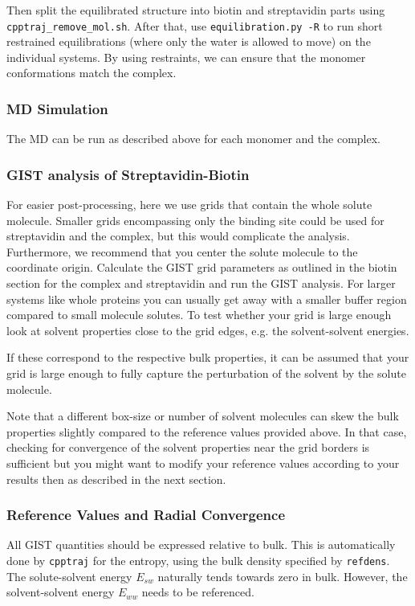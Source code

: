 \documentclass[9pt,tutorial]{livecoms}
\newcommand{\software}{\texttt}
\newcommand\inlinecode{\texttt}
\begin{document}
Then split the equilibrated structure into biotin and streptavidin parts using \software{cpptraj\_remove\_mol.sh}.
After that, use \software{equilibration.py -R} to run short restrained 
equilibrations (where only the water is allowed to move) on the individual 
systems.
By using restraints, we can ensure that the monomer conformations match the complex.

\subsubsection{MD Simulation}
The MD can be run as described above for each monomer and the complex.

\subsubsection{GIST analysis of Streptavidin-Biotin}
For easier post-processing, here we use grids that contain the whole solute molecule.
Smaller grids encompassing only the binding site could be used for streptavidin and the complex, but this would complicate the analysis.
Furthermore, we recommend that you center the solute molecule to the coordinate origin.
Calculate the GIST grid parameters as outlined in the biotin section for the complex and streptavidin and run the GIST analysis.
For larger systems like whole proteins you can usually get away with a smaller buffer region compared to small molecule solutes.
To test whether your grid is large enough look at solvent properties close to the grid edges, e.g. the solvent-solvent energies.

If these correspond to the respective bulk properties, it can be assumed that your grid is large enough to fully capture the perturbation of the solvent by the solute molecule.

Note that a different box-size or number of solvent molecules can skew the bulk properties slightly compared to the reference values provided above.
In that case, checking for convergence of the solvent properties near the grid borders is sufficient but you might want to modify your reference values according to your results then as described in the next section.

\subsubsection{Reference Values and Radial Convergence}
All GIST quantities should be expressed relative to bulk.
This is automatically done by \software{cpptraj} for the entropy, using the bulk density specified by \inlinecode{refdens}.
The solute-solvent energy $E_{sw}$ naturally tends towards zero in bulk.
However, the solvent-solvent energy $E_{ww}$ needs to be referenced.
\end{document}
